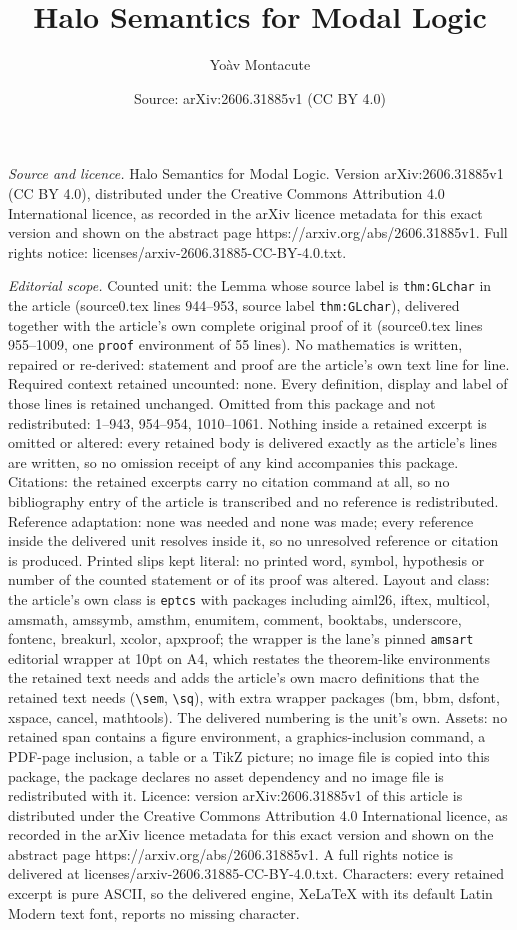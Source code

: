 \documentclass[10pt,a4paper]{amsart}
\title[Halo Semantics for Modal Logic]{Halo Semantics for Modal Logic}
\author{Yo\`av Montacute}
\date{Source: arXiv:2606.31885v1 (CC BY 4.0)}
\begin{document}
\maketitle

\noindent\emph{Source and licence.} Halo Semantics for Modal Logic. Version arXiv:2606.31885v1 (CC BY 4.0), distributed under the Creative Commons Attribution 4.0 International licence, as recorded in the arXiv licence metadata for this exact version and shown on the abstract page https://arxiv.org/abs/2606.31885v1. Full rights notice: licenses/arxiv-2606.31885-CC-BY-4.0.txt.\par\smallskip

\noindent\textit{Editorial scope.} Counted unit: the Lemma whose source label is \texttt{thm:GLchar} in the article (source0.tex lines 944--953, source label \texttt{thm:GLchar}), delivered together with the article's own complete original proof of it (source0.tex lines 955--1009, one \texttt{proof} environment of 55 lines). No mathematics is written, repaired or re-derived: statement and proof are the article's own text line for line. Required context retained uncounted: none. Every definition, display and label of those lines is retained unchanged. Omitted from this package and not redistributed: 1--943, 954--954, 1010--1061. Nothing inside a retained excerpt is omitted or altered: every retained body is delivered exactly as the article's lines are written, so no omission receipt of any kind accompanies this package. Citations: the retained excerpts carry no citation command at all, so no bibliography entry of the article is transcribed and no reference is redistributed. Reference adaptation: none was needed and none was made; every reference inside the delivered unit resolves inside it, so no unresolved reference or citation is produced. Printed slips kept literal: no printed word, symbol, hypothesis or number of the counted statement or of its proof was altered. Layout and class: the article's own class is \texttt{eptcs} with packages including aiml26, iftex, multicol, amsmath, amssymb, amsthm, enumitem, comment, booktabs, underscore, fontenc, breakurl, xcolor, apxproof; the wrapper is the lane's pinned \texttt{amsart} editorial wrapper at 10pt on A4, which restates the theorem-like environments the retained text needs and adds the article's own macro definitions that the retained text needs (\texttt{\textbackslash sem}, \texttt{\textbackslash sq}), with extra wrapper packages (bm, bbm, dsfont, xspace, cancel, mathtools). The delivered numbering is the unit's own. Assets: no retained span contains a figure environment, a graphics-inclusion command, a PDF-page inclusion, a table or a TikZ picture; no image file is copied into this package, the package declares no asset dependency and no image file is redistributed with it. Licence: version arXiv:2606.31885v1 of this article is distributed under the Creative Commons Attribution 4.0 International licence, as recorded in the arXiv licence metadata for this exact version and shown on the abstract page https://arxiv.org/abs/2606.31885v1. A full rights notice is delivered at licenses/arxiv-2606.31885-CC-BY-4.0.txt. Characters: every retained excerpt is pure ASCII, so the delivered engine, XeLaTeX with its default Latin Modern text font, reports no missing character.
\end{document}
